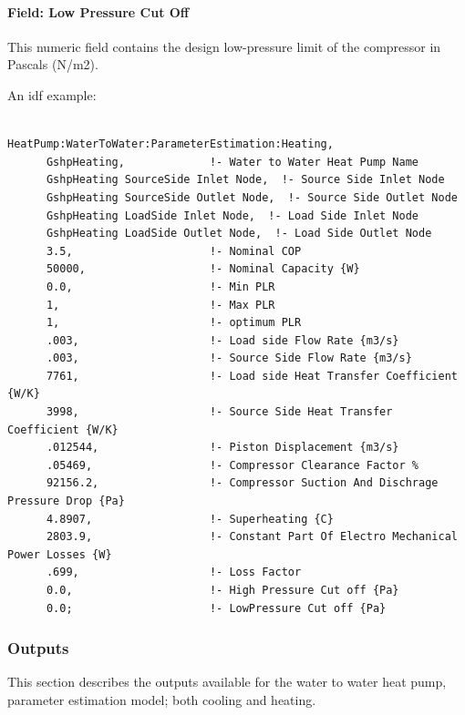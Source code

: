 \paragraph{Field: Low Pressure Cut Off}\label{field-low-pressure-cut-off-1}

This numeric field contains the design low-pressure limit of the compressor in Pascals (N/m2).

An idf example:

\begin{lstlisting}

HeatPump:WaterToWater:ParameterEstimation:Heating,
      GshpHeating,             !- Water to Water Heat Pump Name
      GshpHeating SourceSide Inlet Node,  !- Source Side Inlet Node
      GshpHeating SourceSide Outlet Node,  !- Source Side Outlet Node
      GshpHeating LoadSide Inlet Node,  !- Load Side Inlet Node
      GshpHeating LoadSide Outlet Node,  !- Load Side Outlet Node
      3.5,                     !- Nominal COP
      50000,                   !- Nominal Capacity {W}
      0.0,                     !- Min PLR
      1,                       !- Max PLR
      1,                       !- optimum PLR
      .003,                    !- Load side Flow Rate {m3/s}
      .003,                    !- Source Side Flow Rate {m3/s}
      7761,                    !- Load side Heat Transfer Coefficient {W/K}
      3998,                    !- Source Side Heat Transfer Coefficient {W/K}
      .012544,                 !- Piston Displacement {m3/s}
      .05469,                  !- Compressor Clearance Factor %
      92156.2,                 !- Compressor Suction And Dischrage Pressure Drop {Pa}
      4.8907,                  !- Superheating {C}
      2803.9,                  !- Constant Part Of Electro Mechanical Power Losses {W}
      .699,                    !- Loss Factor
      0.0,                     !- High Pressure Cut off {Pa}
      0.0;                     !- LowPressure Cut off {Pa}
\end{lstlisting}

\subsubsection{Outputs}\label{outputs-13-003}

This section describes the outputs available for the water to water heat pump, parameter estimation model; both cooling and heating.

